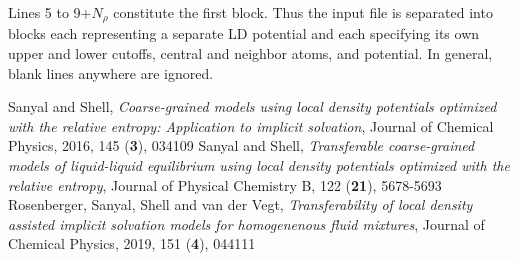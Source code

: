 \documentclass[12pt,a4paper]{article}
\begin{document}
\noindent Lines 5 to 9+$N_\rho$ constitute the first block. Thus the input file is separated into blocks each representing a separate LD potential and each specifying its own upper and lower cutoffs, central and neighbor atoms, and potential.  In general, blank lines anywhere are ignored. 
%
%
%
\begin{thebibliography}{9}
%
Sanyal and Shell, \emph{Coarse-grained models using local density potentials optimized with the relative entropy: Application to implicit solvation}, Journal of Chemical Physics, 2016, 145 (\textbf{3}), 034109
Sanyal and Shell, \emph{Transferable coarse-grained models of liquid-liquid equilibrium using local density potentials optimized with the relative entropy}, Journal of Physical Chemistry B, 122 (\textbf{21}), 5678-5693
Rosenberger, Sanyal, Shell and van der Vegt, \emph{Transferability of local density assisted implicit solvation models for homogenenous fluid mixtures}, Journal of Chemical Physics, 2019, 151 (\textbf{4}), 044111
%
\end{thebibliography}
%
\end{document}
